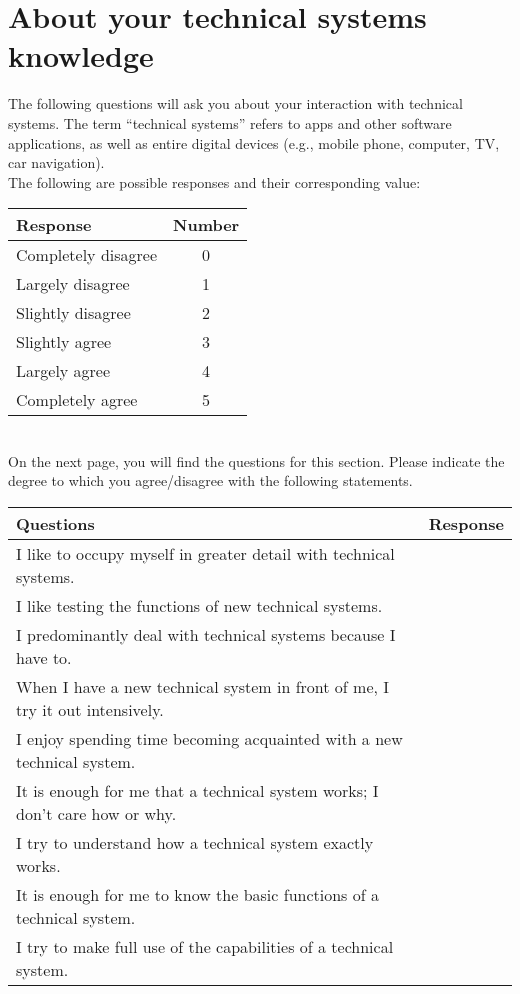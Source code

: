 \section{About your technical systems knowledge}
The following questions will ask you about your interaction with technical systems. The term “technical systems” refers to apps and other software applications, as well as entire digital devices (e.g., mobile phone, computer, TV, car navigation). \\
The following are possible responses and their corresponding value:
\begin{table}[h]
\centering
\renewcommand{\arraystretch}{1.5}
\begin{tabularx}{\textwidth}{|X|c|}
\hline
\textbf{Response} & \textbf{Number} \\ \hline
Completely disagree &  0\\ \hline
Largely disagree&  1\\ \hline
Slightly disagree &  2\\ \hline
Slightly agree &  3\\ \hline
Largely agree &  4\\ \hline
Completely agree &  5\\ \hline
\end{tabularx}
\end{table}
\\
On the next page, you will find the questions for this section.
\clearpage
Please indicate the degree to which you agree/disagree with the following statements.
\begin{Form}
\begin{table}[h]
\centering
\renewcommand{\arraystretch}{1.5}
\begin{tabularx}{\textwidth}{|X|X|}
\hline
\textbf{Questions} & \textbf{Response} \\ \hline
I like to occupy myself in greater detail with technical systems. &  \\ \hline
I like testing the functions of new technical systems. &  \\ \hline
I predominantly deal with technical systems because I have to. &  \\ \hline
When I have a new technical system in front of me, I try it out intensively. &  \\ \hline
I enjoy spending time becoming acquainted with a new technical system. &  \\ \hline
It is enough for me that a technical system works; I don’t care how or why. &  \\ \hline
I try to understand how a technical system exactly works. &  \\ \hline
It is enough for me to know the basic functions of a technical system. &  \\ \hline
I try to make full use of the capabilities of a technical system. &  \\ \hline
\end{tabularx}
\end{table}
\end{Form}